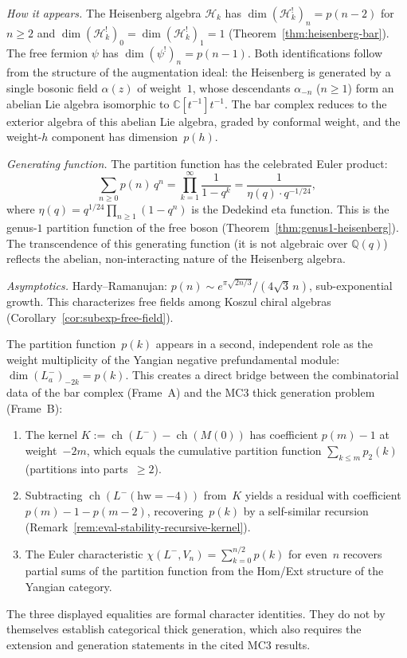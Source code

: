 \emph{How it appears.}
The Heisenberg algebra $\mathcal{H}_k$ has $\dim(\mathcal{H}_k^!)_n = p(n-2)$ for $n \geq 2$ and $\dim(\mathcal{H}_k^!)_0 = \dim(\mathcal{H}_k^!)_1 = 1$ (Theorem~\ref{thm:heisenberg-bar}). The free fermion $\psi$ has $\dim(\psi^!)_n = p(n-1)$. Both identifications follow from the structure of the augmentation ideal: the Heisenberg is generated by a single bosonic field $\alpha(z)$ of weight~$1$, whose descendants $\alpha_{-n}$ ($n \geq 1$) form an abelian Lie algebra isomorphic to $\mathbb{C}[t^{-1}]t^{-1}$. The bar complex reduces to the exterior algebra of this abelian Lie algebra, graded by conformal weight, and the weight-$h$ component has dimension~$p(h)$.

\emph{Generating function.}
The partition function has the celebrated Euler product:
\[
\sum_{n \geq 0} p(n)\, q^n = \prod_{k=1}^{\infty} \frac{1}{1 - q^k}
= \frac{1}{\eta(q) \cdot q^{-1/24}},
\]
where $\eta(q) = q^{1/24}\prod_{n \geq 1}(1-q^n)$ is the Dedekind eta function. This is the genus-$1$ partition function of the free boson (Theorem~\ref{thm:genus1-heisenberg}). The transcendence of this generating function (it is not algebraic over $\mathbb{Q}(q)$) reflects the abelian, non-interacting nature of the Heisenberg algebra.

\emph{Asymptotics.}
Hardy--Ramanujan: $p(n) \sim e^{\pi\sqrt{2n/3}}/(4\sqrt{3}\,n)$, sub-exponential growth. This characterizes free fields among Koszul chiral algebras (Corollary~\ref{cor:subexp-free-field}).

\begin{remark}%
\label{rem:partition-mc3-bridge}%
%
%
The partition function~$p(k)$ appears in a second, independent role
as the weight multiplicity of the Yangian negative prefundamental
module: $\dim(L^-_a)_{-2k} = p(k)$. This creates a direct bridge
between the combinatorial data of the bar complex (Frame~A) and the
MC3 thick generation problem (Frame~B):
\begin{enumerate}[label=\textup{(\roman*)},nosep]
\item The kernel $K := \operatorname{ch}(L^-) - \operatorname{ch}(M(0))$
 has coefficient $p(m) - 1$ at weight~$-2m$, which equals the
 cumulative partition function $\sum_{k \leq m} p_2(k)$
 (partitions into parts~$\geq 2$).
\item Subtracting $\operatorname{ch}(L^-(\mathrm{hw} = -4))$ from~$K$
 yields a residual with coefficient $p(m) - 1 - p(m-2)$,
 recovering~$p(k)$ by a self-similar recursion
 (Remark~\ref{rem:eval-stability-recursive-kernel}).
\item The Euler characteristic
 $\chi(L^-, V_n) = \sum_{k=0}^{n/2} p(k)$ for even~$n$
 recovers partial sums of the partition function from the
 Hom/Ext structure of the Yangian category.
\end{enumerate}
The three displayed equalities are formal character identities.  They do
not by themselves establish categorical thick generation, which also
requires the extension and generation statements in the cited MC3 results.
\end{remark}


